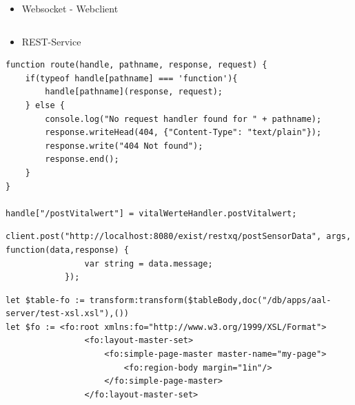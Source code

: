 \documentclass{beamer}
\begin{document}
\begin{frame}[fragile]
\begin{itemize}
	\item Websocket - Webclient
\end{itemize}
\begin{lstlisting}

\end{lstlisting}
\end{frame}

\begin{frame}[fragile]
\begin{itemize}
	\item REST-Service
\end{itemize}
\begin{lstlisting}
function route(handle, pathname, response, request) {
    if(typeof handle[pathname] === 'function'){
        handle[pathname](response, request);
    } else {
        console.log("No request handler found for " + pathname);
        response.writeHead(404, {"Content-Type": "text/plain"});
        response.write("404 Not found");
        response.end();
    }
}

handle["/postVitalwert"] = vitalWerteHandler.postVitalwert;
\end{lstlisting}

\end{frame}

\begin{frame}[fragile]
\begin{lstlisting}
client.post("http://localhost:8080/exist/restxq/postSensorData", args, function(data,response) {
                var string = data.message;
            });
\end{lstlisting}
\end{frame}



\begin{frame}[fragile]
\begin{lstlisting}
let $table-fo := transform:transform($tableBody,doc("/db/apps/aal-server/test-xsl.xsl"),())
let $fo := <fo:root xmlns:fo="http://www.w3.org/1999/XSL/Format">
                <fo:layout-master-set>
                    <fo:simple-page-master master-name="my-page">
                        <fo:region-body margin="1in"/>
                    </fo:simple-page-master>
                </fo:layout-master-set>
   
\end{lstlisting}
\end{frame}   
                
\end{document}
